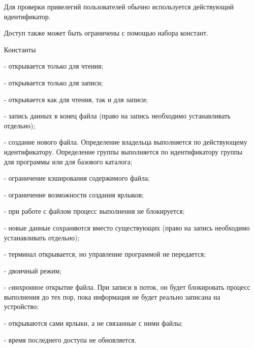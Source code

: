 Для проверки привелегий пользователей обычно используется действующий идентификатор.

Доступ также может быть ограничены с помощью набора констант.

\begin{keylist}{Константы}
  
   - открывается только для чтения; 
  
   - открывается только для записи; 
  
   - открывается как для чтения, так и для записи; 
  
   - запись данных в конец файла (право на запись необходимо устанавливать отдельно); 
  
   - создание нового файла. Определение владельца выполняется по действующему идентификатору. Определение группы выполняется по идентификатору группы для программы или для базового каталога;
  
   - ограничение кэширования содержимого файла;
  
   - ограничение возможности создания ярлыков; 
  
   - при работе с файлом процесс выполнения не блокируется; 
  
   - новые данные сохраняются вместо существующих (право на запись необходимо устанавливать отдельно); 
  
   - терминал открывается, но управление программой не передается; 
  
   - двоичный режим; 
  
   - cинхронное открытие файла. При записи в поток, он будет блокировать процесс выполнения до тех пор, пока информация не будет реально записана на устройство; 
  
   - открываются сами ярлыки, а не связанные с ними файлы; 
  
   - время последнего доступа не обновляется. 
\end{keylist}